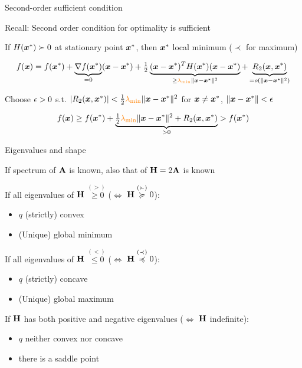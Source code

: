 \documentclass[11pt,compress,t,notes=noshow, xcolor=table]{beamer}
\begin{document}
\begin{framei}[fs=footnotesize]{Second-order sufficient condition}
\item Recall: Second order condition for optimality is sufficient
\item If $H(\bm{x}^\ast) \succ 0$ at stationary point $\bm{x}^\ast$, then $\bm{x}^\ast$ local minimum ($\prec$ for maximum)
\item[] \begin{equation*}
f(\bm{x}) = f(\bm{x}^\ast) + \underbrace{\nabla f(\bm{x}^\ast)}_{=0}(\bm{x}-\bm{x}^\ast) + \tfrac{1}{2}\underbrace{(\bm{x}-\bm{x}^\ast)^T H(\bm{x}^\ast)(\bm{x}-\bm{x}^\ast)}_{\ge \textcolor{orange}{\lambda_\text{min}} \|\bm{x}-\bm{x}^\ast\|^2} + \underbrace{R_2(\bm{x},\bm{x}^\ast)}_{=o(\|\bm{x}-\bm{x}^\ast\|^2)}
\end{equation*}
\item Choose $\epsilon>0$ s.t. $|R_2(\bm{x},\bm{x}^\ast)| < \tfrac{1}{2} \textcolor{orange}{\lambda_\text{min}} \|\bm{x}-\bm{x}^\ast\|^2$ for $\bm{x} \neq \bm{x}^\ast$, $\|\bm{x}-\bm{x}^\ast\|<\epsilon$
\item[] \begin{equation*}
f(\bm{x}) \ge f(\bm{x}^\ast) + \underbrace{\tfrac{1}{2} \textcolor{orange}{\lambda_\text{min}} \|\bm{x}-\bm{x}^\ast\|^2 + R_2(\bm{x},\bm{x}^\ast)}_{>0} > f(\bm{x}^\ast)
\end{equation*}
\end{framei}


\begin{framei}{Eigenvalues and shape}
\item If spectrum of $\mathbf{A}$ is known, also that of $\mathbf{H} = 2\mathbf{A}$ is known
\item If all eigenvalues of $\mathbf{H}$ $\overset{(>)}{\ge 0}$ ($\Leftrightarrow$ $\mathbf{H} \overset{(\succ)}{\succcurlyeq} 0$):
\begin{itemize}
\item $q$ (strictly) convex
\item (Unique) global minimum
\end{itemize}
\item If all eigenvalues of $\mathbf{H}$ $\overset{(<)}{\le 0}$ ($\Leftrightarrow$ $\mathbf{H} \overset{(\prec)}{\preccurlyeq} 0$):
\begin{itemize}
\item $q$ (strictly) concave
\item (Unique) global maximum
\end{itemize}
\item If $\mathbf{H}$ has both positive and negative eigenvalues ($\Leftrightarrow$ $\mathbf{H}$ indefinite):
\begin{itemize}
\item $q$ neither convex nor concave
\item there is a saddle point
\end{itemize}
\end{framei}
\end{document}

